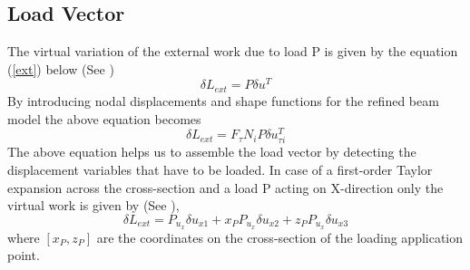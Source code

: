 \documentclass[a4paper,12pt]{article}
\begin{document}
\subsection*{Load Vector}
\indent\indent\indent\indent The virtual variation of the external work due to load P is given by the equation (\ref{ext}) below (See \cite{carrera2011beam})           
\begin{equation}
\delta L_{ext} = P\delta u^{T}
\label{ext}
\end{equation}
By introducing nodal displacements and shape functions for the refined beam model the above equation becomes 
\begin{equation}
\delta L_{ext} = F_{\tau}N_{i}P\delta u^{T}_{\tau i}
\end{equation}
The above equation helps us to assemble the load vector  by detecting the displacement variables that have to be loaded. In case of a first-order Taylor expansion across the cross-section and a load P acting on X-direction only the virtual work is given by (See \cite{carrera2011beam}),
\begin{equation}
\delta L_{ext} = P_{u_{x}}\delta u_{x1} + x_{P} P_{u_{x}}\delta u_{x2} + z_{P} P_{u_{x}}\delta u_{x3}
\end{equation}
where $[x_{P}, z_{P}] $ are the coordinates on the cross-section of the loading
application point.\\
\end{document}
